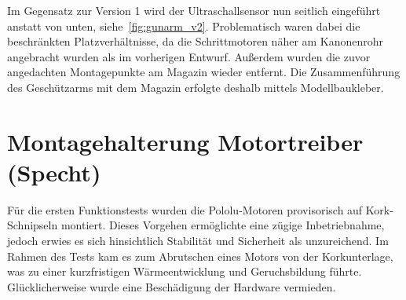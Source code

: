 Im Gegensatz zur Version 1 wird der Ultraschallsensor nun seitlich eingeführt anstatt von unten, siehe~\ref{fig:gunarm_v2}. Problematisch waren dabei die beschränkten Platzverhältnisse, da die Schrittmotoren näher am Kanonenrohr angebracht wurden als im vorherigen Entwurf. Außerdem wurden die zuvor angedachten Montagepunkte am Magazin wieder entfernt. Die Zusammenführung des Geschützarms mit dem Magazin erfolgte deshalb mittels Modellbaukleber.

\section{Montagehalterung Motortreiber (Specht)}

Für die ersten Funktionstests wurden die Pololu-Motoren provisorisch auf Kork-Schnipseln montiert. Dieses Vorgehen ermöglichte eine zügige Inbetriebnahme, jedoch erwies es sich hinsichtlich Stabilität und Sicherheit als unzureichend. Im Rahmen des Tests kam es zum Abrutschen eines Motors von der Korkunterlage, was zu einer kurzfristigen Wärmeentwicklung und Geruchsbildung führte. Glücklicherweise wurde eine Beschädigung der Hardware vermieden.

